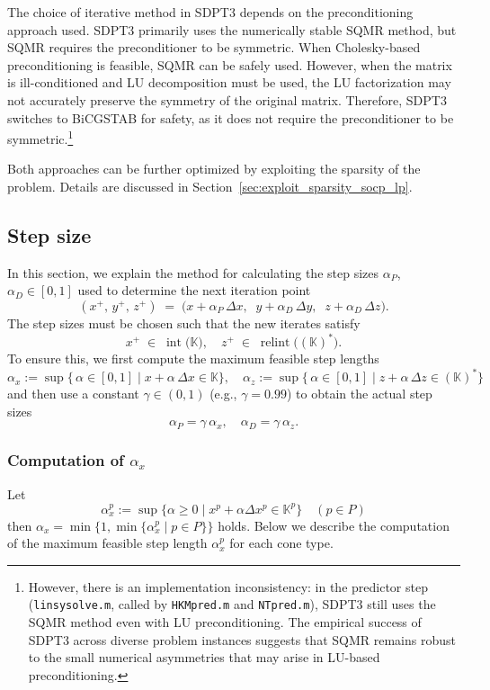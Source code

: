 The choice of iterative method in SDPT3 depends on the preconditioning approach used.
SDPT3 primarily uses the numerically stable SQMR method, but SQMR requires the preconditioner to be symmetric.
When Cholesky-based preconditioning is feasible, SQMR can be safely used.
However, when the matrix is ill-conditioned and LU decomposition must be used, the LU factorization may not accurately preserve the symmetry of the original matrix. 
Therefore, SDPT3 switches to BiCGSTAB for safety, as it does not require the preconditioner to be symmetric.\footnote{
  However, there is an implementation inconsistency: in the predictor step (\texttt{linsysolve.m}, called by \texttt{HKMpred.m} and \texttt{NTpred.m}), SDPT3 still uses the SQMR method even with LU preconditioning. 
  The empirical success of SDPT3 across diverse problem instances suggests that SQMR remains robust to the small numerical asymmetries that may arise in LU-based preconditioning.
}

Both approaches can be further optimized by exploiting the sparsity of the problem. 
Details are discussed in Section~\ref{sec:exploit_sparsity_socp_lp}.



\subsection{Step size} \label{sec:step_size}
In this section, we explain the method for calculating the step sizes $\alpha_P$, $\alpha_D \in [0, 1]$ used to determine the next iteration point 
\[
  (x^+,\,y^+,\,z^+) 
  \;=\; 
  \bigl(x + \alpha_P\,\Delta x,\;\; y + \alpha_D\,\Delta y,\;\; z + \alpha_D\,\Delta z\bigr).
\]
The step sizes must be chosen such that the new iterates satisfy
\[
  x^+   %
  \;\in\; \operatorname{int}\bigl(\mathbb{K}\bigr),
  \quad
  z^+   %
  \;\in\; \operatorname{relint}\bigl((\mathbb{K})^*\bigr).
\]
To ensure this, we first compute the maximum feasible step lengths
\[
  \alpha_x  := \sup \bigl\{\,\alpha \in [0,1] \mid x + \alpha \,\Delta x \in \mathbb{K}\bigr\},
  \quad
  \alpha_z  := \sup \bigl\{\,\alpha \in [0,1] \mid z + \alpha \,\Delta z \in (\mathbb{K})^*\bigr\}
\]
and then use a constant $\gamma\in(0,1)$ (e.g., $\gamma=0.99$) to obtain the actual step sizes
\[
  \alpha_P 
    = \gamma \,\alpha_x, 
  \quad
  \alpha_D 
    = \gamma \,\alpha_z.
\]


\subsubsection{Computation of $\alpha_x$}
Let \[
  \alpha^p_x:=\sup\{\alpha \geq 0 \mid x^p + \alpha \Delta x^p \in \mathbb{K}^p\} \quad (p\in P)
\]
then $\alpha_x = \min\{1, \min\{\alpha^p_x \mid p \in P\}\}$ holds.
Below we describe the computation of the maximum feasible step length $\alpha^p_x$ for each cone type.

